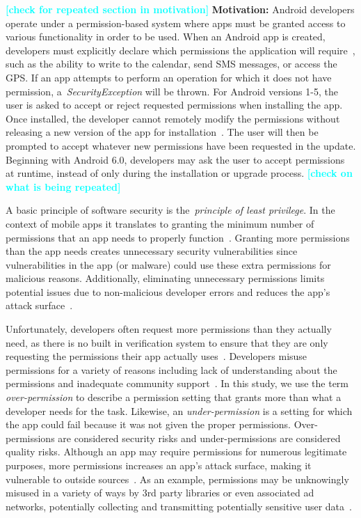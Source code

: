 \documentclass{sig-alternate-05-2015}
\newcommand{\todo}[1]{\textcolor{cyan}{\textbf{[#1]}}}
\begin{document}
\todo{check for repeated section in motivation}
\textbf{Motivation:} Android developers operate under a permission-based system where apps must be granted access to various functionality in order to be used. When an Android app is created, developers must explicitly declare which permissions the application will require~\cite{Felt:2011:APD:2046707.2046779}, such as the ability to write to the calendar, send SMS messages, or access the GPS. If an app attempts to perform an operation for which it does not have permission, a~\emph{SecurityException} will be thrown. For Android versions 1-5, the user is asked to accept or reject requested permissions when installing the app. Once installed, the developer cannot remotely modify the permissions without releasing a new version of the app for installation~\cite{shaerpour2013trends}. The user will then be prompted to accept whatever new permissions have been requested in the update. Beginning with Android 6.0, developers may ask the user to accept permissions at runtime, instead of only during the installation or upgrade process.
\todo{check on what is being repeated}

A basic principle of software security is the~\emph{principle of least privilege}. In the context of mobile apps it translates to granting the minimum number of permissions that an app needs to properly function~\cite{saltzer1975protection}. Granting more permissions than the app needs creates unnecessary security vulnerabilities since vulnerabilities in the app (or malware) could use these extra permissions for malicious reasons. Additionally, eliminating unnecessary permissions limits potential issues due to non-malicious developer errors and reduces the app's attack surface~\cite{5482589}.

Unfortunately, developers often request more permissions than they actually need, as there is no built in verification system to ensure that they are only requesting the permissions their app actually uses~\cite{Felt:2011:APD:2046707.2046779}. Developers misuse permissions for a variety of reasons including lack of understanding about the permissions and inadequate community support~\cite{Stevens:2013:APU:2487085.2487093}. In this study, we use the term \emph{over-permission} to describe a permission setting that grants more than what a developer needs for the task. Likewise, an \emph{under-permission} is a setting for which the app could fail because it was not given the proper permissions. Over-permissions are considered security risks and under-permissions are considered quality risks. Although an app may require permissions for numerous legitimate purposes, more permissions increases an app's attack surface, making it vulnerable to outside sources~\cite{5482589, Felt:2011:APD:2046707.2046779}. As an example, permissions may be unknowingly misused in a variety of ways by 3rd party libraries or even  associated ad networks, potentially collecting and transmitting potentially sensitive user data~\cite{Grace:2012:UEA:2185448.2185464,7371575}.
\end{document}
